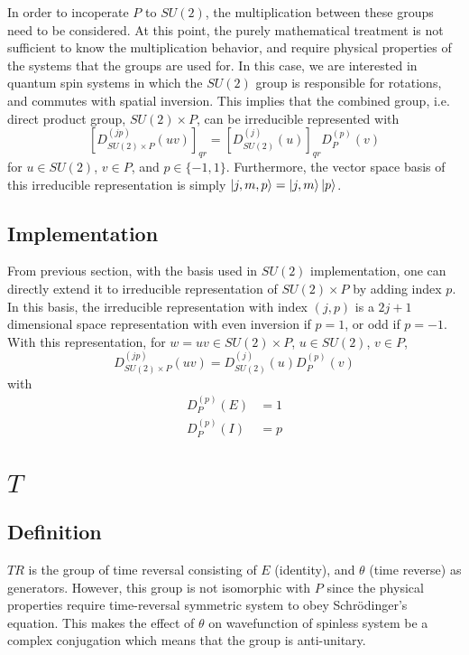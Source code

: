 \documentclass[preprint, 12pt]{revtex4-2}
\numberwithin{equation}{section}
\begin{document}
In order to incoperate $P$ to $SU(2)$, the multiplication between these groups need to be considered. At this point, the purely mathematical treatment is not sufficient to know the multiplication behavior, and require physical properties of the systems that the groups are used for. In this case, we are interested in quantum spin systems in which the $SU(2)$ group is responsible for rotations, and commutes with spatial inversion. This implies that the combined group, i.e. direct product group, $SU(2)\times P$, can be irreducible represented with
\begin{equation}
    \left[D_{SU(2)\times P}^{(jp)}(uv)\right]_{qr} = \left[D_{SU(2)}^{(j)}(u)\right]_{qr}D_P^{(p)}(v)
\end{equation}
for $u\in SU(2)$, $v\in P$, and $p\in \{-1, 1\}$. Furthermore, the vector space basis of this irreducible representation is simply $\ket{j, m, p}=\ket{j, m}\ket{p}$.

\subsection{Implementation}
From previous section, with the basis used in $SU(2)$ implementation, one can directly extend it to irreducible representation of $SU(2)\times P$ by adding index $p$. In this basis, the irreducible representation with index $(j, p)$ is a $2j+1$ dimensional space representation with even inversion if $p=1$, or odd if $p=-1$. With this representation, for $w=uv\in SU(2)\times P$, $u \in SU(2)$, $v\in P$,
\begin{equation}
    D_{SU(2)\times P}^{(jp)}(uv) = D_{SU(2)}^{(j)}(u)D_P^{(p)}(v)
\end{equation}
with
\begin{equation}
    \begin{aligned}
        D_P^{(p)}(E) &= 1 \\
        D_P^{(p)}(I) &= p
    \end{aligned}
\end{equation}

\section{$T$}

\subsection{Definition}
$TR$ is the group of time reversal consisting of $E$ (identity), and $\theta$ (time reverse) as generators. However, this group is not isomorphic with $P$ since the physical properties require time-reversal symmetric system to obey Schr\"odinger's equation. This makes the effect of $\theta$ on wavefunction of spinless system be a complex conjugation which means that the group is anti-unitary.
\end{document}

